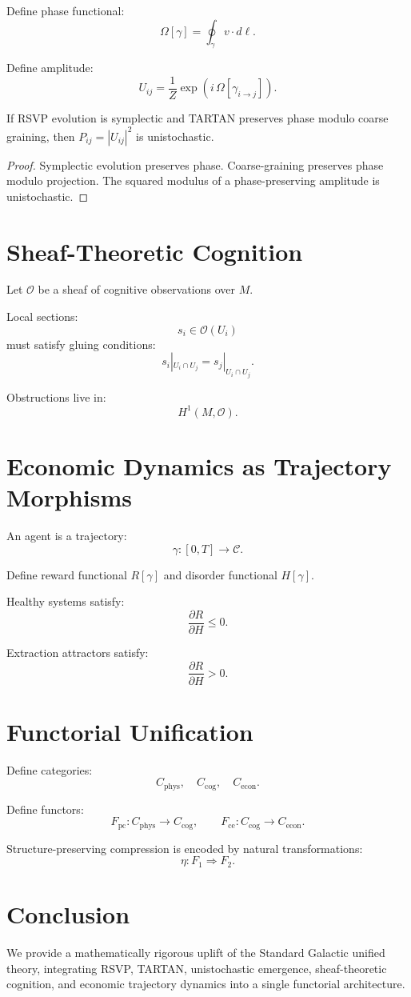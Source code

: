\documentclass[11pt]{article}
\begin{document}
Define phase functional:
\[
\Omega[\gamma] = \oint_\gamma v\cdot d\ell.
\]

Define amplitude:
\[
U_{ij} = \frac{1}{Z} \exp(i\,\Omega[\gamma_{i\to j}]).
\]

\begin{theorem}
If RSVP evolution is symplectic and TARTAN preserves phase modulo coarse
graining, then $P_{ij} = |U_{ij}|^2$ is unistochastic.
\end{theorem}

\begin{proof}
Symplectic evolution preserves phase. Coarse-graining preserves phase modulo
projection. The squared modulus of a phase-preserving amplitude is unistochastic.
\end{proof}

\section{Sheaf-Theoretic Cognition}

Let $\mathcal{O}$ be a sheaf of cognitive observations over $M$.

Local sections:
\[
s_i \in \mathcal{O}(U_i)
\]
must satisfy gluing conditions:
\[
s_i|_{U_i\cap U_j} = s_j|_{U_i\cap U_j}.
\]

Obstructions live in:
\[
H^1(M, \mathcal{O}).
\]

\section{Economic Dynamics as Trajectory Morphisms}

An agent is a trajectory:
\[
\gamma : [0,T] \to \mathcal{C}.
\]

Define reward functional $R[\gamma]$ and disorder functional $H[\gamma]$.

Healthy systems satisfy:
\[
\frac{\partial R}{\partial H} \le 0.
\]

Extraction attractors satisfy:
\[
\frac{\partial R}{\partial H} > 0.
\]

\section{Functorial Unification}

Define categories:
\[
C_{\mathrm{phys}},\quad C_{\mathrm{cog}},\quad C_{\mathrm{econ}}.
\]

Define functors:
\[
F_{\mathrm{pc}} : C_{\mathrm{phys}} \to C_{\mathrm{cog}},\qquad
F_{\mathrm{ce}} : C_{\mathrm{cog}} \to C_{\mathrm{econ}}.
\]

Structure-preserving compression is encoded by natural transformations:
\[
\eta : F_1 \Rightarrow F_2.
\]

\section{Conclusion}

We provide a mathematically rigorous uplift of the Standard Galactic unified
theory, integrating RSVP, TARTAN, unistochastic emergence, sheaf-theoretic
cognition, and economic trajectory dynamics into a single functorial
architecture.
\end{document}

